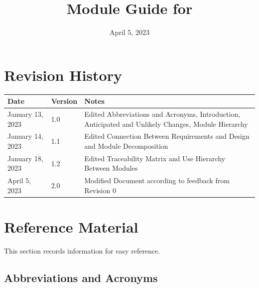 \documentclass[12pt, titlepage]{article}
\begin{document}
\title{Module Guide for \progname{}} 
\author{\authname}
\date{April 5, 2023}

\maketitle


\section{Revision History}

\begin{tabularx}{\textwidth}{p{3cm}p{2cm}X}
\toprule {\bf Date} & {\bf Version} & {\bf Notes}\\
\midrule
January 13, 2023 & 1.0 & Edited Abbreviations and Acronyms, Introduction, Anticipated and Unlikely Changes, Module Hierarchy\\
January 14, 2023 & 1.1 & Edited Connection Between Requirements and Design and Module Decomposition\\
January 18, 2023 & 1.2 & Edited Traceability Matrix and Use Hierarchy Between Modules\\
April 5, 2023 & 2.0 & Modified Document according to feedback from Revision 0\\
\bottomrule
\end{tabularx}

\newpage

\section{Reference Material}

This section records information for easy reference.

\subsection{Abbreviations and Acronyms}
\end{document}
